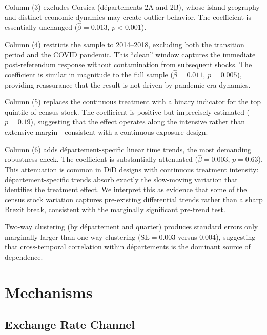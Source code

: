 \documentclass[12pt]{article}
\begin{document}
Column (3) excludes Corsica (d\'epartements 2A and 2B), whose island geography and distinct economic dynamics may create outlier behavior. The coefficient is essentially unchanged ($\hat{\beta} = 0.013$, $p < 0.001$).

Column (4) restricts the sample to 2014--2018, excluding both the transition period and the COVID pandemic. This ``clean'' window captures the immediate post-referendum response without contamination from subsequent shocks. The coefficient is similar in magnitude to the full sample ($\hat{\beta} = 0.011$, $p = 0.005$), providing reassurance that the result is not driven by pandemic-era dynamics.

Column (5) replaces the continuous treatment with a binary indicator for the top quintile of census stock. The coefficient is positive but imprecisely estimated ($p = 0.19$), suggesting that the effect operates along the intensive rather than extensive margin---consistent with a continuous exposure design.

Column (6) adds d\'epartement-specific linear time trends, the most demanding robustness check. The coefficient is substantially attenuated ($\hat{\beta} = 0.003$, $p = 0.63$). This attenuation is common in DiD designs with continuous treatment intensity: d\'epartement-specific trends absorb exactly the slow-moving variation that identifies the treatment effect. We interpret this as evidence that some of the census stock variation captures pre-existing differential trends rather than a sharp Brexit break, consistent with the marginally significant pre-trend test.

Two-way clustering (by d\'epartement and quarter) produces standard errors only marginally larger than one-way clustering ($\text{SE} = 0.003$ versus $0.004$), suggesting that cross-temporal correlation within d\'epartements is the dominant source of dependence.

{\footnotesize}


\section{Mechanisms}\label{sec:mechanisms}

\subsection{Exchange Rate Channel}
\end{document}
